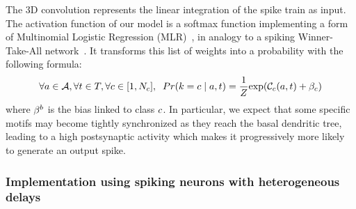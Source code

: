 \documentclass[default]{sn-jnl}%
\theoremstyle{thmstyleone}%
\theoremstyle{thmstyletwo}%
\theoremstyle{thmstylethree}%
\begin{document}
The 3D convolution represents the linear integration of the spike train as input. The activation function of our model is a softmax function implementing a form of Multinomial Logistic Regression (MLR)~\citep{grimaldi_robust_2022}, in analogy to a spiking Winner-Take-All network~\citep{nessler_bayesian_2013}. 
It transforms this list of weights into a probability with the following formula:
\begin{equation}\label{eq:mlr}
\forall a \in \mathcal{A}, \forall t \in T, \forall c \in [1, N_c], \; \;
Pr(k=c \; \vert \; a, t) =
\frac 1 Z
{\exp  (\mathcal{C}_c(a, t) +\beta_c) }
\end{equation} 
where $\beta^b$ is the bias linked to class $c$. 
In particular, we expect that some specific motifs may become tightly synchronized as they reach the basal dendritic tree, leading to a high postsynaptic activity which makes it progressively more likely to generate an output spike.

\subsubsection{Implementation using spiking neurons with heterogeneous delays}
\end{document}
